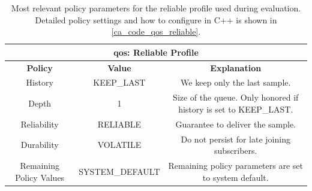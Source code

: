 \begin{table}[H]
    \centering
\begin{tabular}{ |c|c|c| }
\hline
\multicolumn{3}{|c|}{\gls{qos}: Reliable Profile} \\
\hline
\hline
\textbf{Policy} & \textbf{Value} & \textbf{Explanation} \\\hline
    History & KEEP\_LAST &  
        \begin{minipage}{6cm}
	       \vspace{8pt}
		      We keep only the last sample.
	       \vspace{8pt}
	    \end{minipage} \\\hline
    Depth & 1 &  
        \begin{minipage}{6cm}
	       \vspace{8pt}
            Size of the queue. Only honored if history is set to KEEP\_LAST.
	       \vspace{8pt}
	    \end{minipage} \\\hline
    Reliability & RELIABLE &  
        \begin{minipage}{6cm}
	       \vspace{8pt}
		      Guarantee to deliver the sample.
	       \vspace{8pt}
	    \end{minipage} \\\hline
    Durability & VOLATILE & 
        \begin{minipage}{6cm}
	       \vspace{8pt}
		      Do not persist for late joining subscribers.
	       \vspace{8pt}
	    \end{minipage} \\\hline
    Remaining Policy Values & SYSTEM\_DEFAULT & 
        \begin{minipage}{6cm}
	       \vspace{8pt}
		      Remaining policy parameters are set to system default.
	       \vspace{8pt}
	    \end{minipage} \\\hline
\end{tabular}
    \caption{Most relevant policy parameters for the reliable profile used during evaluation. Detailed policy settings and how to configure in C++ is shown in \autoref{ca_code_qos_reliable}.}
    \label{c6_tab_reliable_qos}
\end{table}
